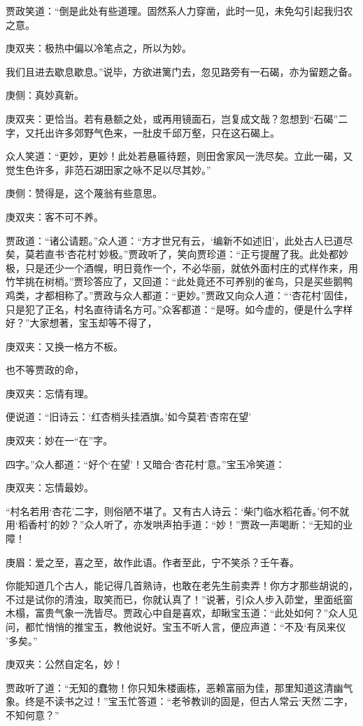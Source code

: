 \begin{parag}
    贾政笑道：“倒是此处有些道理。固然系人力穿凿，此时一见，未免勾引起我归农之意。\begin{note}庚双夹：极热中偏以冷笔点之，所以为妙。\end{note}我们且进去歇息歇息。”说毕，方欲进篱门去，忽见路旁有一石碣，亦为留题之备。\begin{note}庚侧：真妙真新。\end{note}\begin{note}庚双夹：更恰当。若有悬额之处，或再用镜面石，岂复成文哉？忽想到“石碣”二字，又托出许多郊野气色来，一肚皮千邱万壑，只在这石碣上。\end{note}众人笑道：“更妙，更妙！此处若悬匾待题，则田舍家风一洗尽矣。立此一碣，又觉生色许多，非范石湖田家之咏不足以尽其妙。”\begin{note}庚侧：赞得是，这个蔑翁有些意思。\end{note}\begin{note}庚双夹：客不可不养。\end{note}贾政道：“诸公请题。”众人道：“方才世兄有云，‘编新不如述旧’，此处古人已道尽矣，莫若直书‘杏花村’妙极。”贾政听了，笑向贾珍道：“正亏提醒了我。此处都妙极，只是还少一个酒幌，明日竟作一个，不必华丽，就依外面村庄的式样作来，用竹竿挑在树梢。”贾珍答应了，又回道：“此处竟还不可养别的雀鸟，只是买些鹅鸭鸡类，才都相称了。”贾政与众人都道：“更妙。”贾政又向众人道：“‘杏花村’固佳，只是犯了正名，村名直待请名方可。”众客都道：“是呀。如今虚的，便是什么字样好？”大家想著，宝玉却等不得了，\begin{note}庚双夹：又换一格方不板。\end{note}也不等贾政的命，\begin{note}庚双夹：忘情有理。\end{note}便说道：“旧诗云：‘红杏梢头挂酒旗。’如今莫若‘杏帘在望’\begin{note}庚双夹：妙在一“在”字。\end{note}四字。”众人都道：“好个‘在望’！又暗合‘杏花村’意。”宝玉冷笑道：\begin{note}庚双夹：忘情最妙。\end{note}“村名若用‘杏花’二字，则俗陋不堪了。又有古人诗云：‘柴门临水稻花香。’何不就用‘稻香村’的妙？”众人听了，亦发哄声拍手道：“妙！”贾政一声喝断：“无知的业障！\begin{note}庚眉：爱之至，喜之至，故作此语。作者至此，宁不笑杀？壬午春。\end{note}你能知道几个古人，能记得几首熟诗，也敢在老先生前卖弄！你方才那些胡说的，不过是试你的清浊，取笑而已，你就认真了！”说著，引众人步入茆堂，里面纸窗木榻，富贵气象一洗皆尽。贾政心中自是喜欢，却瞅宝玉道：“此处如何？”众人见问，都忙悄悄的推宝玉，教他说好。宝玉不听人言，便应声道：“不及‘有凤来仪 ’多矣。”\begin{note}庚双夹：公然自定名，妙！\end{note}贾政听了道：“无知的蠢物！你只知朱楼画栋，恶赖富丽为佳，那里知道这清幽气象。终是不读书之过！”宝玉忙答道：“老爷教训的固是，但古人常云‘天然’二字，不知何意？”
\end{parag}


